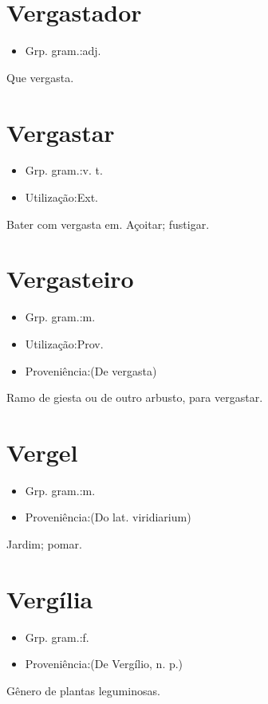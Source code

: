 \documentclass{article}
\begin{document}
\section{Vergastador}
\begin{itemize}
\item {Grp. gram.:adj.}
\end{itemize}
Que vergasta.
\section{Vergastar}
\begin{itemize}
\item {Grp. gram.:v. t.}
\end{itemize}
\begin{itemize}
\item {Utilização:Ext.}
\end{itemize}
Bater com vergasta em.
Açoitar; fustigar.
\section{Vergasteiro}
\begin{itemize}
\item {Grp. gram.:m.}
\end{itemize}
\begin{itemize}
\item {Utilização:Prov.}
\end{itemize}
\begin{itemize}
\item {Proveniência:(De \textunderscore vergasta\textunderscore )}
\end{itemize}
Ramo de giesta ou de outro arbusto, para vergastar.
\section{Vergel}
\begin{itemize}
\item {Grp. gram.:m.}
\end{itemize}
\begin{itemize}
\item {Proveniência:(Do lat. \textunderscore viridiarium\textunderscore )}
\end{itemize}
Jardim; pomar.
\section{Vergília}
\begin{itemize}
\item {Grp. gram.:f.}
\end{itemize}
\begin{itemize}
\item {Proveniência:(De \textunderscore Vergílio\textunderscore , n. p.)}
\end{itemize}
Gênero de plantas leguminosas.
\end{document}
